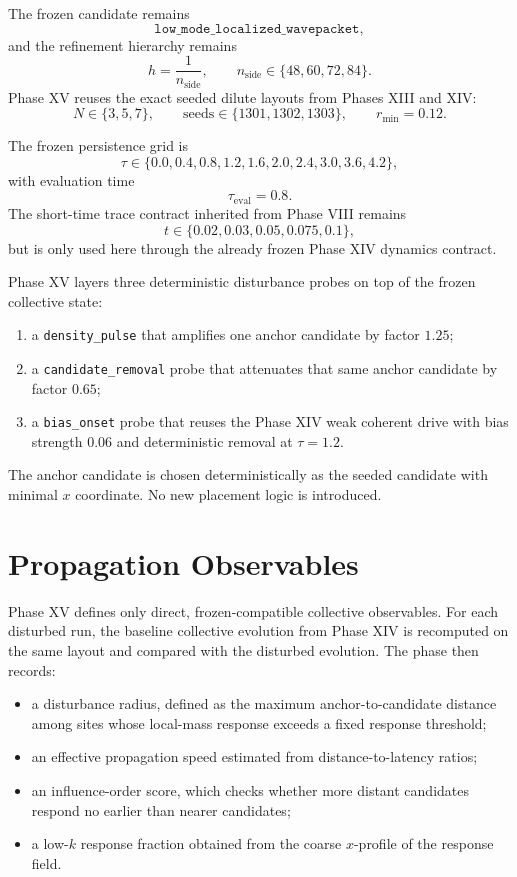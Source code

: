 \documentclass[11pt]{article}
\begin{document}
The frozen candidate remains
\[
\texttt{low\_mode\_localized\_wavepacket},
\]
and the refinement hierarchy remains
\[
h = \frac{1}{n_{\mathrm{side}}},
\qquad
n_{\mathrm{side}} \in \{48,60,72,84\}.
\]
Phase XV reuses the exact seeded dilute layouts from Phases XIII and XIV:
\[
N \in \{3,5,7\},
\qquad
\text{seeds} \in \{1301,1302,1303\},
\qquad
r_{\min}=0.12.
\]

The frozen persistence grid is
\[
\tau \in \{0.0,0.4,0.8,1.2,1.6,2.0,2.4,3.0,3.6,4.2\},
\]
with evaluation time
\[
\tau_{\mathrm{eval}} = 0.8.
\]
The short-time trace contract inherited from Phase VIII remains
\[
t \in \{0.02,0.03,0.05,0.075,0.1\},
\]
but is only used here through the already frozen Phase XIV dynamics contract.

Phase XV layers three deterministic disturbance probes on top of the frozen collective state:
\begin{enumerate}
\item a \texttt{density\_pulse} that amplifies one anchor candidate by factor $1.25$;
\item a \texttt{candidate\_removal} probe that attenuates that same anchor candidate by factor $0.65$;
\item a \texttt{bias\_onset} probe that reuses the Phase XIV weak coherent drive with bias strength $0.06$ and deterministic removal at $\tau=1.2$.
\end{enumerate}

The anchor candidate is chosen deterministically as the seeded candidate with minimal $x$ coordinate. No new placement logic is introduced.

\section{Propagation Observables}

Phase XV defines only direct, frozen-compatible collective observables. For each disturbed run, the baseline collective evolution from Phase XIV is recomputed on the same layout and compared with the disturbed evolution. The phase then records:
\begin{itemize}
\item a disturbance radius, defined as the maximum anchor-to-candidate distance among sites whose local-mass response exceeds a fixed response threshold;
\item an effective propagation speed estimated from distance-to-latency ratios;
\item an influence-order score, which checks whether more distant candidates respond no earlier than nearer candidates;
\item a low-$k$ response fraction obtained from the coarse $x$-profile of the response field.
\end{itemize}
\end{document}
